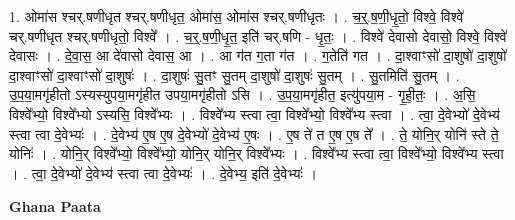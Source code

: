 \documentclass[17pt]{extarticle}
\begin{document}
1. ओमा॑स श्चर्.षणीधृत श्चर्.षणीधृत॒ ओमा॑स॒ ओमा॑स श्चर्.षणीधृतः । . च॒र्॒.ष॒णी॒धृ॒तो॒ विश्वे॒ विश्वे॑ चर्.षणीधृत श्चर्.षणीधृतो॒ विश्वे᳚ । . च॒र्॒.ष॒णी॒धृ॒त॒ इति॑ चर्.षणि - धृ॒तः॒ । . विश्वे॑ देवासो देवासो॒ विश्वे॒ विश्वे॑ देवासः । . दे॒वा॒स॒ आ दे॑वासो देवास॒ आ । . आ ग॑त ग॒ता ग॑त । . ग॒तेति॑ गत । . दा॒श्वाꣳसो॑ दा॒शुषो॑ दा॒शुषो॑ दा॒श्वाꣳसो॑ दा॒श्वाꣳसो॑ दा॒शुषः॑ । . दा॒शुषः॑ सु॒तꣳ सु॒तम् दा॒शुषो॑ दा॒शुषः॑ सु॒तम् । . सु॒तमिति॑ सु॒तम् । . उ॒प॒या॒मगृ॑हीतो ऽस्यस्युपया॒मगृ॑हीत उपया॒मगृ॑हीतो ऽसि । . उ॒प॒या॒मगृ॑हीत॒ इत्यु॑पया॒म - गृ॒ही॒तः॒ । . अ॒सि॒ विश्वे᳚भ्यो॒ विश्वे᳚भ्यो ऽस्यसि॒ विश्वे᳚भ्यः । . विश्वे᳚भ्य स्त्वा त्वा॒ विश्वे᳚भ्यो॒ विश्वे᳚भ्य स्त्वा । . त्वा॒ दे॒वेभ्यो॑ दे॒वेभ्य॑ स्त्वा त्वा दे॒वेभ्यः॑ । . दे॒वेभ्य॑ ए॒ष ए॒ष दे॒वेभ्यो॑ दे॒वेभ्य॑ ए॒षः । . ए॒ष ते॑ त ए॒ष ए॒ष ते᳚ । . ते॒ योनि॒र् योनि॑ स्ते ते॒ योनिः॑ । . योनि॒र् विश्वे᳚भ्यो॒ विश्वे᳚भ्यो॒ योनि॒र् योनि॒र् विश्वे᳚भ्यः । . विश्वे᳚भ्य स्त्वा त्वा॒ विश्वे᳚भ्यो॒ विश्वे᳚भ्य स्त्वा । . त्वा॒ दे॒वेभ्यो॑ दे॒वेभ्य॑ स्त्वा त्वा दे॒वेभ्यः॑ । . दे॒वेभ्य॒ इति॑ दे॒वेभ्यः॑ । \newline

\textbf{Ghana Paata } \newline
\end{document}
